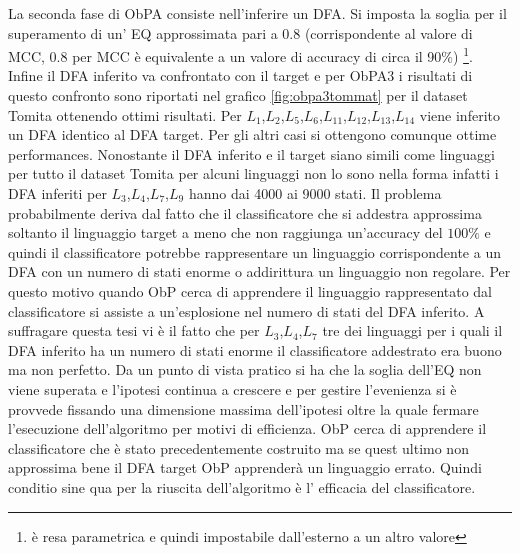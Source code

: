 La seconda fase di \ac{ObPA} consiste nell'inferire un \ac{DFA}. Si imposta la soglia per il superamento di un' \ac{EQ} approssimata pari a 0.8 (corrispondente al valore di MCC, 0.8 per MCC è equivalente a un valore di accuracy di circa il 90$\%$) \footnote{è resa parametrica e quindi impostabile dall'esterno a un altro valore}. Infine il \ac{DFA} inferito va confrontato con il target e per \ac{ObPA}3 i risultati di questo  confronto sono riportati nel grafico   \ref{fig:obpa3tommat} per il dataset Tomita  ottenendo ottimi risultati. Per $L_1$,$L_2$,$L_5$,$L_6$,$L_{11}$,$L_{12}$,$L_{13}$,$L_{14}$ viene inferito un \ac{DFA} identico al \ac{DFA} target. Per gli altri casi si ottengono comunque ottime performances. Nonostante il \ac{DFA} inferito e il target siano simili come linguaggi per tutto il dataset Tomita per alcuni linguaggi non lo sono nella forma infatti  i \ac{DFA} inferiti per $L_3$,$L_4$,$L_7$,$L_9$ hanno dai 4000 ai 9000 stati.  Il problema probabilmente deriva dal fatto che il classificatore che si addestra approssima soltanto il linguaggio target a meno che non raggiunga un'accuracy del $100\%$ e quindi il classificatore potrebbe rappresentare un linguaggio corrispondente a un \ac{DFA} con un numero di stati enorme o addirittura un linguaggio non regolare. Per questo motivo quando \ac{ObP} cerca di apprendere il linguaggio rappresentato dal classificatore si assiste a un'esplosione nel numero di stati del \ac{DFA} inferito. A suffragare questa tesi vi è il fatto che per $L_3$,$L_4$,$L_7$ tre dei linguaggi per i quali il \ac{DFA} inferito ha un numero di stati enorme il classificatore addestrato era buono ma non perfetto.  Da un punto di vista pratico si ha che la soglia dell'\ac{EQ} non viene superata e l'ipotesi continua a crescere e per gestire  l'evenienza si è provvede fissando una dimensione massima dell'ipotesi oltre la quale fermare l'esecuzione dell'algoritmo per motivi di efficienza.   \ac{ObP} cerca di apprendere il classificatore che è stato precedentemente costruito ma se quest ultimo non approssima bene il \ac{DFA} target \ac{ObP} apprenderà un linguaggio errato. Quindi conditio sine qua per la riuscita dell'algoritmo è l' efficacia del classificatore.\\

